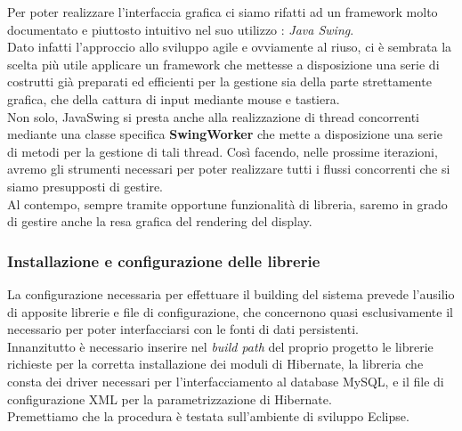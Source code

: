 \documentclass[11pt]{article}
\begin{document}
Per poter realizzare l'interfaccia grafica ci siamo rifatti ad un framework molto documentato e piuttosto intuitivo nel suo utilizzo : \emph{Java Swing}.\\
Dato infatti l'approccio allo sviluppo agile e ovviamente al riuso, ci è sembrata la scelta più utile applicare un framework che mettesse a disposizione una serie di costrutti già preparati ed efficienti per la gestione sia della parte strettamente grafica, che della cattura di input mediante mouse e tastiera.\\

Non solo, JavaSwing si presta anche alla realizzazione di thread concorrenti mediante una classe specifica \textbf{SwingWorker} che mette a disposizione una serie di metodi per la gestione di tali thread. Così facendo, nelle prossime iterazioni, avremo gli strumenti necessari per poter realizzare tutti i flussi concorrenti che si siamo presupposti di gestire.\\

Al contempo, sempre tramite opportune funzionalità di libreria, saremo in grado di gestire anche la resa grafica del rendering del display.\\
\subsubsection{Installazione e configurazione delle librerie}
La configurazione necessaria per effettuare il building del sistema prevede l'ausilio di apposite librerie e file di configurazione, che concernono quasi esclusivamente il necessario per poter interfacciarsi con le fonti di dati persistenti.\\
Innanzitutto è necessario inserire nel \emph{build path} del proprio progetto le librerie richieste per la corretta installazione dei moduli di Hibernate, la libreria che consta dei driver necessari per l'interfacciamento al database MySQL, e il file di configurazione XML per la parametrizzazione di Hibernate.\\
Premettiamo che la procedura è testata sull'ambiente di sviluppo Eclipse.
\end{document}
